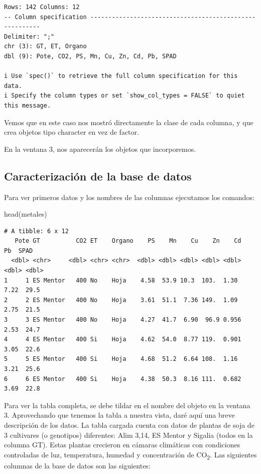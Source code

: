 \documentclass[
  letterpaper,
  DIV=11,
  numbers=noendperiod]{scrartcl}
\newenvironment{Shaded}{\begin{snugshade}}{\end{snugshade}}
\newcommand{\FunctionTok}[1]{\textcolor[rgb]{0.28,0.35,0.67}{#1}}
\newcommand{\NormalTok}[1]{\textcolor[rgb]{0.00,0.23,0.31}{#1}}
\begin{document}
\begin{verbatim}
Rows: 142 Columns: 12
-- Column specification --------------------------------------------------------
Delimiter: ";"
chr (3): GT, ET, Organo
dbl (9): Pote, CO2, PS, Mn, Cu, Zn, Cd, Pb, SPAD

i Use `spec()` to retrieve the full column specification for this data.
i Specify the column types or set `show_col_types = FALSE` to quiet this message.
\end{verbatim}

Vemos que en este caso nos mostró directamente la clase de cada columna,
y que crea objetos tipo character en vez de factor.

En la ventana 3, nos aparecerán los objetos que incorporemos.

\hypertarget{caracterizaciuxf3n-de-la-base-de-datos}{%
\subsection{Caracterización de la base de
datos}\label{caracterizaciuxf3n-de-la-base-de-datos}}

Para ver primeros datos y los nombres de las columnas ejecutamos los
comandos:

\begin{Shaded}
\begin{Highlighting}[]
\FunctionTok{head}\NormalTok{(metales)}
\end{Highlighting}
\end{Shaded}

\begin{verbatim}
# A tibble: 6 x 12
   Pote GT          CO2 ET    Organo    PS    Mn    Cu    Zn    Cd    Pb  SPAD
  <dbl> <chr>     <dbl> <chr> <chr>  <dbl> <dbl> <dbl> <dbl> <dbl> <dbl> <dbl>
1     1 ES Mentor   400 No    Hoja    4.58  53.9 10.3  103.  1.30   7.22  29.5
2     2 ES Mentor   400 No    Hoja    3.61  51.1  7.36 149.  1.09   2.75  21.5
3     3 ES Mentor   400 No    Hoja    4.27  41.7  6.90  96.9 0.956  2.53  24.7
4     4 ES Mentor   400 Si    Hoja    4.62  54.0  8.77 119.  0.901  3.05  22.6
5     5 ES Mentor   400 Si    Hoja    4.68  51.2  6.64 108.  1.16   3.21  25.6
6     6 ES Mentor   400 Si    Hoja    4.38  50.3  8.16 111.  0.682  3.69  22.8
\end{verbatim}

Para ver la tabla completa, se debe tildar en el nombre del objeto en la
ventana 3. Aprovechando que tenemos la tabla a nuestra vista, daré aquí
una breve descripción de los datos. La tabla cargada cuenta con datos de
plantas de soja de 3 cultivares (o genotipos) diferentes: Alim 3,14, ES
Mentor y Sigalia (todos en la columna GT). Estas plantas crecieron en
cámaras climáticas con condiciones controladas de luz, temperatura,
humedad y concentración de CO\textsubscript{2}. Las siguientes columnas
de la base de datos son las siguientes:
\end{document}
